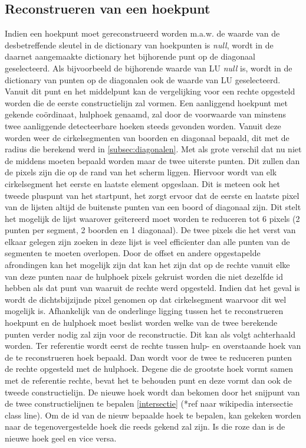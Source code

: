	\subsection{Reconstrueren van een hoekpunt}
		
		Indien een hoekpunt moet gereconstrueerd worden m.a.w. de waarde van de desbetreffende sleutel in de dictionary van hoekpunten is \textit{null}, wordt in de daarnet aangemaakte dictionary het bijhorende punt op de diagonaal geselecteerd. Als bijvoorbeeld de bijhorende waarde van LU \textit{null} is, wordt in de dictionary van punten op de diagonalen ook de waarde van LU geselecteerd.  Vanuit dit punt en het middelpunt kan de vergelijking voor een rechte opgesteld worden die de eerste constructielijn zal vormen. Een aanliggend hoekpunt met gekende coördinaat, hulphoek genaamd, zal door de voorwaarde van minstens twee aanliggende detecteerbare hoeken steeds gevonden worden. Vanuit deze worden weer de cirkelsegmenten van boorden en diagonaal bepaald, dit met de radius die berekend werd in \ref{subsec:diagonalen}. Met als grote verschil dat nu niet de middens moeten bepaald worden maar de twee uiterste punten. Dit zullen dan de pixels zijn die op de rand van het scherm liggen. Hiervoor wordt van elk cirkelsegment het eerste en laatste element opgeslaan. Dit is meteen ook het tweede pluspunt van het startpunt, het zorgt ervoor dat de eerste en laatste pixel van de lijsten altijd de buitenste punten van een boord of diagonaal zijn. Dit stelt het mogelijk de lijst waarover geïtereerd moet worden te reduceren tot 6 pixels (2 punten per segment, 2 boorden en 1 diagonaal). De twee pixels die het verst van elkaar gelegen zijn zoeken in deze lijst is veel efficïenter dan alle punten van de segmenten te moeten overlopen. Door de offset en andere opgestapelde afrondingen kan het mogelijk zijn dat  kan het zijn dat op de rechte vanuit elke van deze punten naar de hulphoek pixels gekruist worden die niet dezelfde id hebben als dat punt van waaruit de rechte werd opgesteld. Indien dat het geval is wordt de dichtsbijzijnde pixel genomen op dat cirkelsegment waarvoor dit wel mogelijk is. Afhankelijk van de onderlinge ligging tussen het te reconstrueren hoekpunt en de hulphoek moet beslist worden welke van de twee berekende punten verder nodig zal zijn voor de reconstructie. Dit kan als volgt achterhaald worden. Ter referentie wordt eerst de rechte tussen hulp- en overstaande hoek van de te reconstrueren hoek bepaald. Dan wordt voor de twee te reduceren punten de rechte opgesteld met de hulphoek. Degene die de grootste hoek vormt samen met de referentie rechte, bevat het te behouden punt en deze vormt dan ook de tweede constructielijn. De nieuwe hoek wordt dan bekomen door het snijpunt van de twee constructielijnen te bepalen \ref{intersectie} (*ref naar wikipedia intersectie class line). Om de id van de nieuw bepaalde hoek te bepalen, kan gekeken worden naar de tegenovergestelde hoek die reeds gekend zal zijn. Is die roze dan is de nieuwe hoek geel en vice versa. 